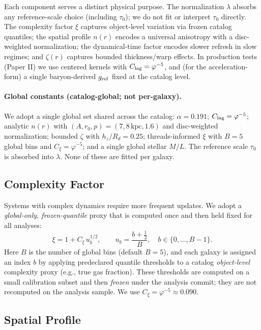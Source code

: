 \documentclass[usenatbib]{mnras}
\begin{document}
Each component serves a distinct physical purpose. The normalization $\lambda$ absorbs any reference-scale choice (including $\tau_0$); we do not fit or interpret $\tau_0$ directly. The complexity factor $\xi$ captures object-level variation via frozen catalog quantiles; the spatial profile $n(r)$ encodes a universal anisotropy with a disc-weighted normalization; the dynamical-time factor encodes slower refresh in slow regimes; and $\zeta(r)$ captures bounded thickness/warp effects. In production tests (Paper II) we use centered kernels with $C_{\rm lag}=\varphi^{-5}$, and (for the acceleration-form) a single baryon-derived $g_{\rm ref}$ fixed at the catalog level.

\paragraph{Global constants (catalog-global; not per-galaxy).} We adopt a single global set shared across the catalog: $\alpha=0.191$; $C_{\rm lag}=\varphi^{-5}$; analytic $n(r)$ with $(A,r_0,p)=(7,8\,\mathrm{kpc},1.6)$ and disc-weighted normalization; bounded $\zeta$ with $h_z/R_d=0.25$; threads-informed $\xi$ with $B=5$ global bins and $C_\xi=\varphi^{-5}$; and a single global stellar $M/L$. The reference scale $\tau_0$ is absorbed into $\lambda$. None of these are fitted per galaxy.

\subsection{Complexity Factor}

Systems with complex dynamics require more frequent updates. We adopt a \emph{global-only, frozen-quantile} proxy that is computed once and then held fixed for all analyses:
\begin{equation}
\xi = 1 + C_\xi\, u_b^{1/2}, \qquad u_b = \frac{b+\tfrac{1}{2}}{B},\quad b\in\{0,\dots,B{-}1\}.
\end{equation}
Here $B$ is the number of global bins (default $B{=}5$), and each galaxy is assigned an index $b$ by applying predeclared quantile thresholds to a catalog \emph{object-level} complexity proxy (e.g., true gas fraction). These thresholds are computed on a small calibration subset and then \emph{frozen} under the analysis commit; they are not recomputed on the analysis sample. We use $C_\xi = \varphi^{-5} \approx 0.090$.

\subsection{Spatial Profile}
\end{document}
